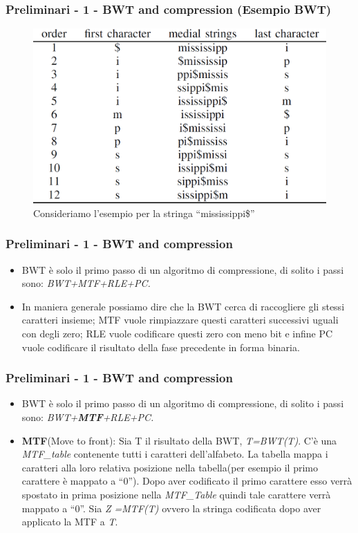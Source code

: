 \documentclass{beamer}
\begin{document}
\begin{frame}
\frametitle{Preliminari - 1 - BWT and compression (Esempio BWT)}
 \begin{figure}[H]
 	\centering
 	\includegraphics[scale=0.45]{Immagini/BWTExample}
 	\caption{Consideriamo l'esempio per la stringa ``mississippi\$''}
 \end{figure}
\end{frame}

\begin{frame}
 \frametitle{Preliminari - 1 - BWT and compression}
 \begin{itemize}
 	\item BWT è solo il primo passo di un algoritmo di compressione, di solito i passi sono: \textit{BWT+MTF+RLE+PC.}
 	\item In maniera generale possiamo dire che la BWT cerca di raccogliere gli stessi caratteri insieme; MTF vuole rimpiazzare questi caratteri successivi uguali con degli zero; RLE vuole codificare questi zero con meno bit e infine PC vuole codificare il risultato della fase precedente in forma binaria. 
 \end{itemize}
\end{frame}

\begin{frame}
\frametitle{Preliminari - 1 - BWT and compression}
	\begin{itemize}
		\item BWT è solo il primo passo di un algoritmo di compressione, di solito i passi sono: \textit{BWT+\textbf{MTF}+RLE+PC.}
		\item \textbf{MTF}(Move to front): Sia T il risultato della BWT, \textit{T=BWT(T)}. C'è una \textit{MTF\_table} contenente tutti i caratteri dell'alfabeto. La tabella mappa i caratteri alla loro relativa posizione nella tabella(per esempio il primo carattere è mappato a ``0''). Dopo aver codificato il primo carattere esso verrà spostato in prima posizione nella \textit{MTF\_Table} quindi tale carattere verrà mappato a ``0''. Sia \textit{Z =MTF(T)} ovvero la stringa codificata dopo aver applicato la MTF a \textit{T}.
	\end{itemize}
\end{frame}
\end{document}
